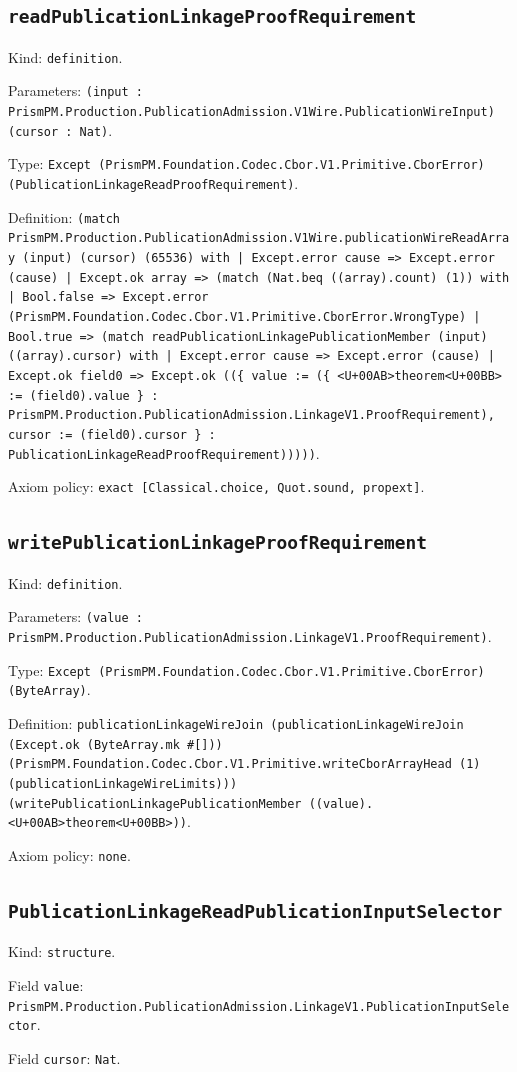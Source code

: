 \documentclass[11pt]{article}
\begin{document}
\subsection*{\texttt{readPublicationLinkageProofRequirement}}
\noindent Kind: \texttt{definition}.\par
\noindent Parameters: \texttt{(input : PrismPM.Production.PublicationAdmission.V1Wire.PublicationWireInput) (cursor : Nat)}.\par
\noindent Type: \texttt{Except (PrismPM.Foundation.Codec.Cbor.V1.Primitive.CborError) (PublicationLinkageReadProofRequirement)}.\par
\noindent Definition: \texttt{(match PrismPM.Production.PublicationAdmission.V1Wire.publicationWireReadArray (input) (cursor) (65536) with | Except.error cause => Except.error (cause) | Except.ok array => (match (Nat.beq ((array).count) (1)) with | Bool.false => Except.error (PrismPM.Foundation.Codec.Cbor.V1.Primitive.CborError.WrongType) | Bool.true => (match readPublicationLinkagePublicationMember (input) ((array).cursor) with | Except.error cause => Except.error (cause) | Except.ok field0 => Except.ok ((\{ value := (\{ <U+00AB>theorem<U+00BB> := (field0).value \} : PrismPM.Production.PublicationAdmission.LinkageV1.ProofRequirement), cursor := (field0).cursor \} : PublicationLinkageReadProofRequirement)))))}.\par
\noindent Axiom policy: \texttt{exact [Classical.choice, Quot.sound, propext]}.\par
\subsection*{\texttt{writePublicationLinkageProofRequirement}}
\noindent Kind: \texttt{definition}.\par
\noindent Parameters: \texttt{(value : PrismPM.Production.PublicationAdmission.LinkageV1.ProofRequirement)}.\par
\noindent Type: \texttt{Except (PrismPM.Foundation.Codec.Cbor.V1.Primitive.CborError) (ByteArray)}.\par
\noindent Definition: \texttt{publicationLinkageWireJoin (publicationLinkageWireJoin (Except.ok (ByteArray.mk \#[])) (PrismPM.Foundation.Codec.Cbor.V1.Primitive.writeCborArrayHead (1) (publicationLinkageWireLimits))) (writePublicationLinkagePublicationMember ((value).<U+00AB>theorem<U+00BB>))}.\par
\noindent Axiom policy: \texttt{none}.\par
\subsection*{\texttt{PublicationLinkageReadPublicationInputSelector}}
\noindent Kind: \texttt{structure}.\par
\noindent Field \texttt{value}: \texttt{PrismPM.Production.PublicationAdmission.LinkageV1.PublicationInputSelector}.\par
\noindent Field \texttt{cursor}: \texttt{Nat}.\par
\end{document}
